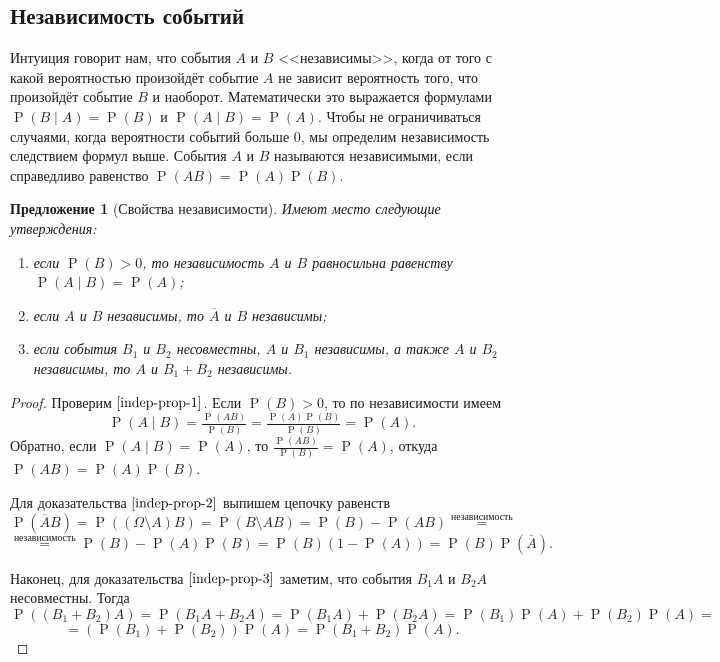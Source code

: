 \documentclass[12pt]{article}
\newtheorem{proposition}[theorem]{Предложение}
\numberwithin{theorem}{section}
\theoremstyle{definition}
\newcommand{\defin}[2]{\hypertarget{#2}{{\color{red} #1}}}
\newcommand{\prob}{\operatorname{P}}
\begin{document}
	\subsection{Независимость событий}
	
	Интуиция говорит нам, что события $ A $ и $ B $ <<независимы>>, когда от того с какой вероятностью произойдёт событие $ A $
	не зависит вероятность того, что произойдёт событие $ B $ и наоборот.
	Математически это выражается формулами $ \prob(B \mid A) = \prob(B) $ и $ \prob(A \mid B) = \prob(A) $.
	Чтобы не ограничиваться случаями, когда вероятности событий больше 0, мы определим независимость
	следствием формул выше. События $ A $ и $ B $ называются \defin{независимыми}{independent}, если справедливо равенство
	$ \prob(AB) = \prob(A)\prob(B) $.
	
	\begin{proposition}[Свойства независимости] \label{indep-prop}
		Имеют место следующие утверждения:
		\begin{enumerate}
			\item если $ \prob(B) > 0 $, 
			то независимость $ A $ и $ B $ равносильна равенству $ \prob(A \mid B) = \prob(A) $; \label{indep-prop-1}
			\item если $ A $ и $ B $ независимы, то $ \overline{A} $ и $ B $ независимы; \label{indep-prop-2}
			\item если события $ B_1 $ и $ B_2 $ несовместны, $ A $ и $ B_1 $ независимы, а также $ A $ и $ B_2 $ независимы, 
			то $ A $ и $ B_1 + B_2 $ независимы. \label{indep-prop-3}
		\end{enumerate}
	\end{proposition}
	
	\begin{proof}
		Проверим $ \ref{indep-prop-1} $.
		Если $ \prob(B) > 0 $, то по независимости имеем 
		$$ \prob(A \mid B) = \tfrac{\prob(AB)}{\prob(B)} = \tfrac{\prob(A)\prob(B)}{\prob(B)} = \prob(A). $$
		Обратно, если $ \prob(A \mid B) = \prob(A) $, то $ \tfrac{\prob(AB)}{\prob(B)} = \prob(A) $, откуда
		$ \prob(AB) = \prob(A)\prob(B) $.
		
		Для доказательства $ \ref{indep-prop-2} $ выпишем цепочку равенств
		$$ \prob(\overline{A}B) = \prob((\Omega \setminus A)B) = \prob(B \setminus AB) 
		= \prob(B) - \prob(AB) \overset{\text{независимость}}{=} $$ 
		$$ \overset{\text{независимость}}{=} \prob(B) - \prob(A)\prob(B) = \prob(B)(1 - \prob(A)) = \prob(B)\prob(\overline{A}). $$
		
		Наконец, для доказательства $ \ref{indep-prop-3} $ заметим, что события $ B_1A $ и $ B_2A $ несовместны.
		Тогда
		$$ \prob((B_1 + B_2)A) = \prob(B_1A + B_2A) = \prob(B_1A) + \prob(B_2A) 
		= \prob(B_1)\prob(A) + \prob(B_2)\prob(A)= $$ 
		$$ = (\prob(B_1) + \prob(B_2))\prob(A) = \prob(B_1 + B_2)\prob(A). $$
	\end{proof}
\end{document}
